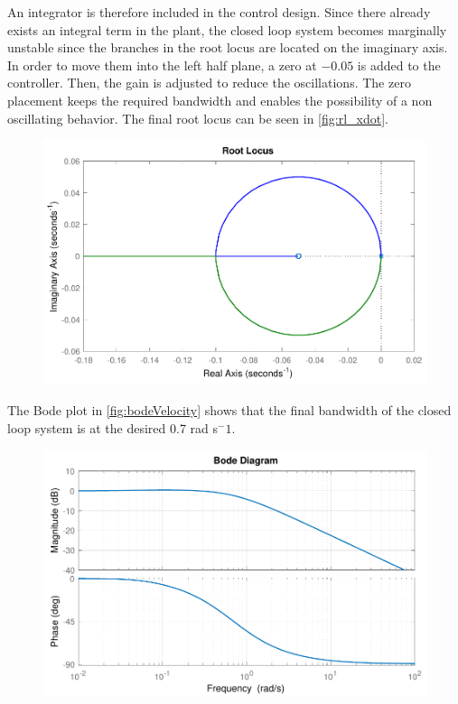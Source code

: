 An integrator is therefore included in the control design. Since there already exists an integral term in the plant, the closed loop system becomes marginally unstable since the branches in the root locus are located on the imaginary axis. In order to move them into the left half plane, a zero at $-0.05$ is added to the controller. Then, the gain is adjusted to reduce the oscillations. The zero placement keeps the required bandwidth and enables the possibility of a non oscillating behavior. The final root locus can be seen in \autoref{fig:rl_xdot}.
%
\begin{figure}[H]
	\includegraphics[scale=.6]{figures/rl_xdot}
	\centering			
	\label{fig:rl_xdot}
\end{figure}
%
The Bode plot in \autoref{fig:bodeVelocity} shows that the final bandwidth of the closed loop system is at the desired 0.7 rad s$^-1$.
%
\begin{figure}[H]
	\includegraphics[scale=.8]{figures/bodeVelocity}
	\centering			
	\label{fig:bodeVelocity}
\end{figure}


